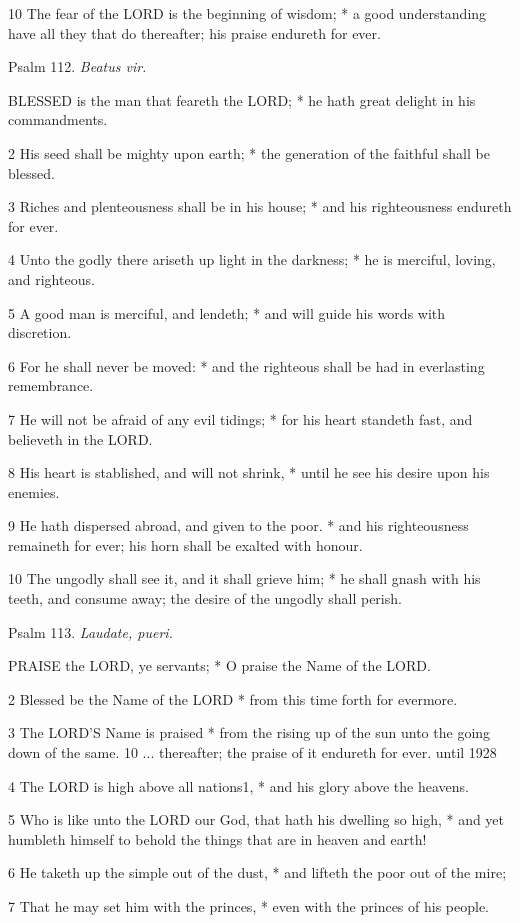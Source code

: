 10 The fear of the LORD is the beginning of wisdom; * a good understanding
have all they that do thereafter; his praise endureth for ever.

Psalm
112. \emph{Beatus vir.}

BLESSED
is the man that feareth the LORD; * he hath great delight in his commandments.

2 His seed shall be mighty upon earth; * the generation
of the faithful shall be blessed.

3 Riches and plenteousness shall be in his house; *
and his righteousness endureth for ever.

4 Unto the godly there ariseth up light in the darkness;
* he is merciful, loving, and righteous.

5 A good man is merciful, and lendeth; * and will guide
his words with discretion.

6 For he shall never be moved: * and the righteous
shall be had in everlasting remembrance.

7 He will not be afraid of any evil tidings; * for
his heart standeth fast, and believeth in the LORD.

8 His heart is stablished, and will not shrink, * until
he see his desire upon his enemies.

9 He hath dispersed abroad, and given to the poor.
* and his righteousness remaineth for ever; his horn shall be exalted
with honour.

10 The ungodly shall see it, and it shall grieve him;
* he shall gnash with his teeth, and consume away; the desire of the ungodly
shall perish.

Psalm
113. \emph{Laudate, pueri.}

PRAISE
the LORD, ye servants; * O praise the Name of the LORD.

2 Blessed be the Name of the LORD * from this time
forth for evermore.

3 The LORD’S Name is praised * from the rising
up of the sun unto the going down of the same. 10 ... thereafter; the praise
of it endureth for ever. until
1928

4 The LORD is high above all nations1, * and his glory above
the heavens.

5 Who is like unto the LORD our God, that hath his
dwelling so high, * and yet humbleth himself to behold the things that
are in heaven and earth!

6 He taketh up the simple out of the dust, * and lifteth
the poor out of the mire;

7 That he may set him with the princes, * even with
the princes of his people.

